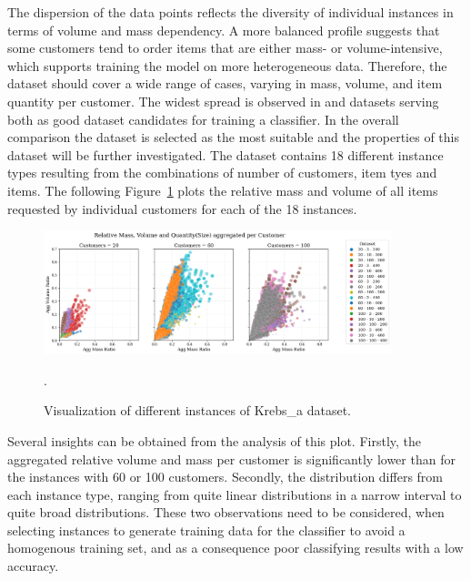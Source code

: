 The dispersion of the data points reflects the diversity of individual instances in terms of volume
and mass dependency. A more balanced profile suggests that some customers tend to order items that
are either mass- or volume-intensive, which supports training the model on more heterogeneous data.
Therefore, the dataset should cover a wide range of cases, varying in mass, volume, and item
quantity per customer. The widest spread is observed in \krebsADataSetText and \gendreauDataSetText datasets serving
both as good dataset candidates for training a classifier. In the overall comparison the \krebsADataSetText dataset
is selected as the most suitable and the properties of this dataset will be further investigated.
The dataset \krebsADataSetText contains 18 different instance types resulting from the combinations
of number of customers, item tyes and items. The following Figure~\ref{fig:krebs_dataset_analysis_detailes} plots
the relative mass and volume of all items requested by individual customers for each of the 18 instances.
\clearpage
\begin{figure}[ht]
    \centering
    \includegraphics[width=0.9\textwidth]{pictures/krebs_instances_detailed.png}
    \caption[Visualization of different instances of Krebs et al. (2021) dataset.]{Visualization of different instances of Krebs\_a dataset.}.
    \label{fig:krebs_dataset_analysis_detailes}
\end{figure}

Several insights can be obtained from the analysis of this plot. Firstly, the aggregated relative
volume and mass per customer is significantly lower than for the instances with 60 or 100 customers. Secondly,
the distribution differs from each instance type, ranging from quite linear distributions in a narrow
interval to quite broad distributions.  These two observations need to be considered, when selecting
instances to generate training data for the classifier to avoid a homogenous training set, and
as a consequence poor classifying results with a low accuracy.




